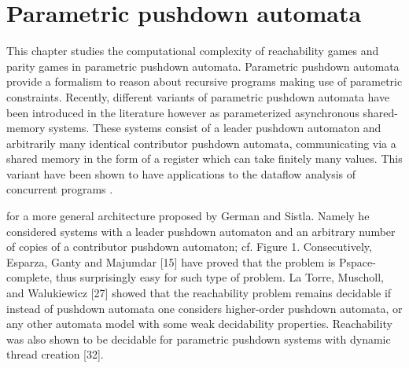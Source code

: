 
\chapter{Parametric pushdown automata}\label{section ppda}


This chapter studies the computational complexity of reachability games and parity games in  parametric pushdown automata. Parametric pushdown automata provide a  formalism to
reason about 
recursive programs
making use of parametric constraints.
Recently, different variants of parametric pushdown automata have been introduced in the literature 
\cite{hague2011parameterised, esparza2016parameterized, fortin2017model} 
however as
parameterized asynchronous shared-memory systems.
These systems consist of a leader pushdown automaton
and arbitrarily many identical contributor pushdown automata, communicating via a shared memory
in the form of a register which can take finitely many values.
This variant have been shown to have applications
to the dataflow analysis of concurrent programs \cite{kahlon2008parameterization}. 

\iffalse
for a more general architecture proposed by German and Sistla. Namely he
considered systems with a leader pushdown automaton and an arbitrary number
of copies of a contributor pushdown automaton; cf. Figure 1. Consecutively,
Esparza, Ganty and Majumdar [15] have proved that the problem is Pspace-
complete, thus surprisingly easy for such type of problem. La Torre, Muscholl,
and Walukiewicz [27] showed that the reachability problem remains decidable if
instead of pushdown automata one considers higher-order pushdown automata, or
any other automata model with some weak decidability properties. Reachability
was also shown to be decidable for parametric pushdown systems with dynamic
thread creation [32].

